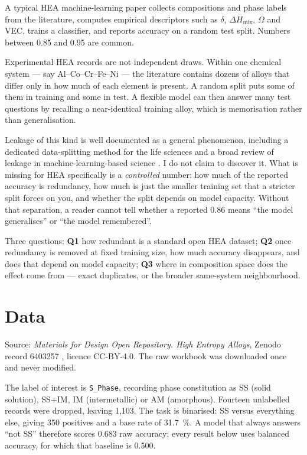\documentclass[11pt]{article}
\begin{document}
A typical HEA machine-learning paper collects compositions and phase labels from the literature, computes empirical descriptors such as $\delta$, $\Delta H_{\mathrm{mix}}$, $\Omega$ and VEC, trains a classifier, and reports accuracy on a random test split. Numbers between 0.85 and 0.95 are common.

Experimental HEA records are not independent draws. Within one chemical system --- say Al--Co--Cr--Fe--Ni --- the literature contains dozens of alloys that differ only in how much of each element is present. A random split puts some of them in training and some in test. A flexible model can then answer many test questions by recalling a near-identical training alloy, which is memorisation rather than generalisation.

Leakage of this kind is well documented as a general phenomenon, including a dedicated data-splitting method for the life sciences \cite{datasail} and a broad review of leakage in machine-learning-based science \cite{kapoor}. I do not claim to discover it. What is missing for HEA specifically is a \emph{controlled} number: how much of the reported accuracy is redundancy, how much is just the smaller training set that a stricter split forces on you, and whether the split depends on model capacity. Without that separation, a reader cannot tell whether a reported 0.86 means ``the model generalises'' or ``the model remembered''.

Three questions: \textbf{Q1} how redundant is a standard open HEA dataset; \textbf{Q2} once redundancy is removed at fixed training size, how much accuracy disappears, and does that depend on model capacity; \textbf{Q3} where in composition space does the effect come from --- exact duplicates, or the broader same-system neighbourhood.

\section{Data}

Source: \emph{Materials for Design Open Repository. High Entropy Alloys}, Zenodo record 6403257 \cite{zenodo}, licence CC-BY-4.0. The raw workbook was downloaded once and never modified.

The label of interest is \texttt{S\_Phase}, recording phase constitution as SS (solid solution), SS+IM, IM (intermetallic) or AM (amorphous). Fourteen unlabelled records were dropped, leaving 1{,}103. The task is binarised: SS versus everything else, giving 350 positives and a base rate of \SI{31.7}{\percent}. A model that always answers ``not SS'' therefore scores 0.683 raw accuracy; every result below uses balanced accuracy, for which that baseline is 0.500.
\end{document}
